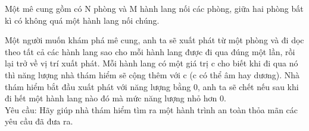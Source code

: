 Một mê cung gồm có N phòng và M hành lang nối các phòng, giữa hai phòng bất kì có không quá một hành lang nối chúng.

Một người muốn khám phá mê cung, anh ta sẽ xuất phát từ một phòng và đi dọc theo tất cả các hành lang sao cho mỗi hành lang được đi qua đúng một lần, rồi lại trở về vị trí xuất phát. Mỗi hành lang có một giá trị c cho biết khi đi qua nó thì năng lượng nhà thám hiểm sẽ cộng thêm với c (c có thể âm hay dương). Nhà thám hiểm bắt đầu xuất phát với năng lượng bằng 0, anh ta sẽ chết nếu sau khi đi hết một hành lang nào đó mà mức năng lượng nhỏ hơn 0.
\\Yêu cầu: Hãy giúp nhà thám hiểm tìm ra một hành trình an toàn thỏa mãn các yêu cầu đã đưa ra.

\